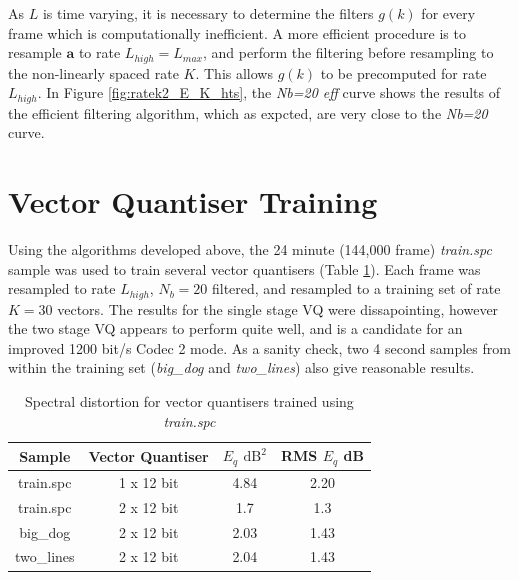 \documentclass{article}
\begin{document}
As $L$ is time varying, it is necessary to determine the filters $g(k)$ for every frame which is computationally inefficient.  A more efficient procedure is to resample $\mathbf{a}$ to rate $L_{high}=L_{max}$, and perform the filtering before resampling to the non-linearly spaced rate $K$.  This allows $g(k)$ to be precomputed for rate $L_{high}$.  In Figure \ref{fig:ratek2_E_K_hts}, the \emph{Nb=20 eff} curve shows the results of the efficient filtering algorithm, which as expcted, are very close to the \emph{Nb=20} curve.

\section{Vector Quantiser Training}

Using the algorithms developed above, the 24 minute (144,000 frame) \emph{train.spc} sample was used to train several vector quantisers (Table \ref{table:train_vqs}).  Each frame was resampled to rate $L_{high}$, $N_b=20$ filtered, and resampled to a training set of rate $K=30$ vectors. The results for the single stage VQ were dissapointing, however the two stage VQ appears to perform quite well, and is a candidate for an improved 1200 bit/s Codec 2 mode.  As a sanity check, two 4 second samples from within the training set (\emph{big\_dog} and \emph{two\_lines}) also give reasonable results.

\begin{table}[h]
\centering
\begin{tabular}{c c c c}
 \hline
 Sample & Vector Quantiser & $E_q$ $\textrm{dB}^2$ & RMS $E_q$ dB \\
 \hline
 train.spc & 1 x 12 bit & 4.84 & 2.20 \\ 
 train.spc & 2 x 12 bit & 1.7 & 1.3 \\
 big\_dog & 2 x 12 bit & 2.03 & 1.43 \\
 two\_lines & 2 x 12 bit & 2.04 & 1.43 \\
 \hline
\end{tabular}
\caption{Spectral distortion for vector quantisers trained using \emph{train.spc}}
\label{table:train_vqs}
\end{table}
\end{document}
